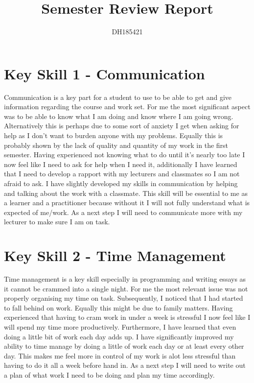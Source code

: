 \documentclass{scrartcl}
\title{Semester Review Report}
\author{DH185421}
\begin{document}
\maketitle






\section{Key Skill 1 - Communication}

Communication is a key part for a student to use to be able to get and give information regarding the course and work set. For me the most significant aspect was to be able to know what I am doing and know where I am going wrong. Alternatively this is perhaps due to some sort of anxiety I get when asking for help as I don’t want to burden anyone with my problems. Equally this is probably shown by the lack of quality and quantity of my work in the first semester. Having experienced not knowing what to do until it's nearly too late I now feel like I need to ask for help when I need it, additionally I have learned that I need to develop a rapport with my lecturers and classmates so I am not afraid to ask. I have slightly developed my skills in communication by helping and talking about the work with a classmate. This skill will be essential to me as a learner and a practitioner because without it I will not fully understand what is expected of me/work. As a next step I will need to communicate more with my lecturer to make sure I am on task.

\section{Key Skill 2 - Time Management}
Time management is a key skill especially in programming and writing essays as it cannot be crammed into a single night. For me the most relevant issue was not properly organising my time on task. Subsequently, I noticed that I had started to fall behind on work. Equally this might be due to family matters. Having experienced that having to cram work in under a week is stressful I now feel like I will spend my time more productively. Furthermore, I have learned that even doing a little bit of work each day adds up. I have significantly improved my ability to time manage by doing a little of work each day or at least every other day. This makes me feel more in control of my work is alot less stressful than having to do it all a week before hand in. As a next step I will need to write out a plan of what work I need to be doing and plan my time accordingly.
\end{document}
